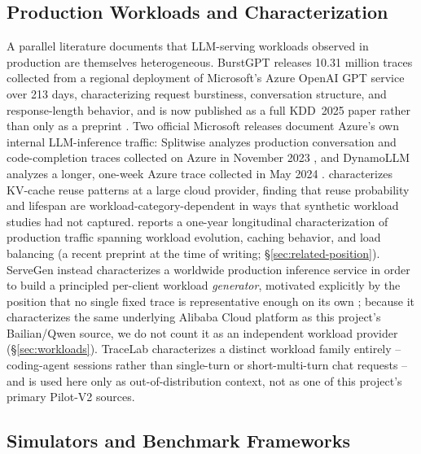 \documentclass[sn-basic,Numbered,pdflatex]{sn-jnl}
\begin{document}
\subsection{Production Workloads and Characterization}
\label{sec:related-workloads}

A parallel literature documents that LLM-serving workloads observed in
production are themselves heterogeneous. BurstGPT releases 10.31 million
traces collected from a regional deployment of Microsoft's Azure OpenAI GPT
service over 213 days, characterizing request burstiness, conversation
structure, and response-length behavior, and is now published as a full
KDD~2025 paper rather than only as a preprint \citep{burstgpt2025}. Two
official Microsoft releases document Azure's own internal LLM-inference
traffic: Splitwise analyzes production conversation and code-completion
traces collected on Azure in November 2023 \citep{patel2024splitwise}, and
DynamoLLM analyzes a longer, one-week Azure trace collected in May 2024
\citep{stojkovic2025dynamollm}. \citet{kvcache_wild2025} characterizes
KV-cache reuse patterns at a large cloud provider, finding that reuse
probability and lifespan are workload-category-dependent in ways that
synthetic workload studies had not captured. \citet{ayearinllmserving2026}
reports a one-year longitudinal characterization of production traffic
spanning workload evolution, caching behavior, and load balancing (a recent
preprint at the time of writing; \S\ref{sec:related-position}).
ServeGen instead characterizes a worldwide production inference service in
order to build a principled per-client workload \emph{generator}, motivated
explicitly by the position that no single fixed trace is representative
enough on its own \citep{servegen2026}; because it characterizes the same
underlying Alibaba Cloud platform as this project's Bailian/Qwen source, we
do not count it as an independent workload provider (\S\ref{sec:workloads}).
TraceLab characterizes a distinct workload family entirely -- coding-agent
sessions rather than single-turn or short-multi-turn chat requests -- and is
used here only as out-of-distribution context, not as one of this project's
primary Pilot-V2 sources.

\subsection{Simulators and Benchmark Frameworks}
\label{sec:related-simulators}
\end{document}

